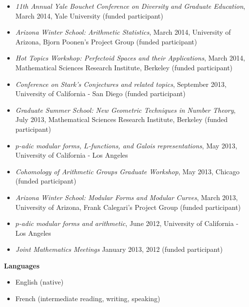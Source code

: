 \documentclass[10pt]{article}
\theoremstyle{plain} \numberwithin{equation}{section}
\theoremstyle{definition}
\begin{document}
\begin{itemize}
\item[] \textit{11th Annual Yale Bouchet Conference on Diversity and Graduate Education}, March 2014, Yale University (funded participant)
\item[] \textit{Arizona Winter School: Arithmetic Statistics}, March 2014, University of Arizona, Bjorn Poonen's Project Group (funded participant)
\item[] \textit{Hot Topics Workshop: Perfectoid Spaces and their Applications}, March 2014, Mathematical Sciences Research Institute, Berkeley (funded participant)
\item[] \textit{Conference on Stark's Conjectures and related topics}, September 2013, University of California - San Diego (funded participant)
\item[] \textit{Graduate Summer School: New Geometric Techniques in Number Theory}, July 2013, Mathematical Sciences Research Institute, Berkeley (funded participant)
\item[] \textit{$p$-adic modular forms, $L$-functions, and Galois representations}, May 2013, University of California - Los Angeles
\item[] \textit{Cohomology of Arithmetic Groups Graduate Workshop}, May 2013, Chicago (funded participant)
\item[] \textit{Arizona Winter School: Modular Forms and Modular Curves}, March 2013, University of Arizona, Frank Calegari's Project Group (funded participant)
\item[] \textit{$p$-adic modular forms and arithmetic}, June 2012, University of California - Los Angeles
\item[] \textit{Joint Mathematics Meetings} January 2013, 2012 (funded participant)
\end{itemize} 

\medskip

{\large\textbf{Languages}} \medskip
\begin{itemize}
    \item[] English (native)
    \item[] French (intermediate reading, writing, speaking)
\end{itemize}
\end{document}

